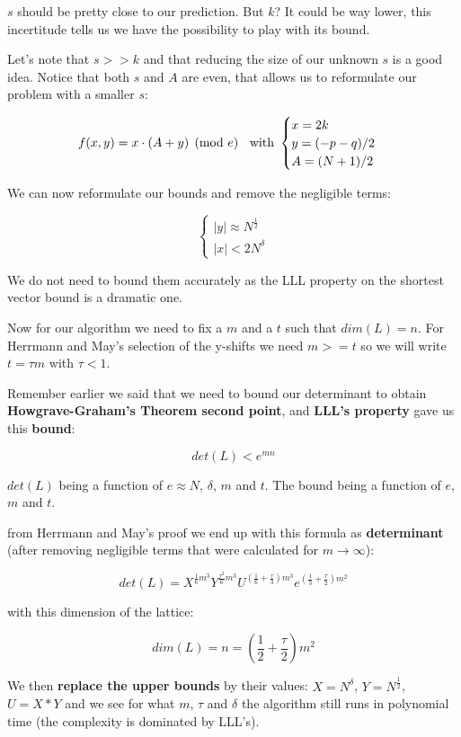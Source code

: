 \documentclass[a4paper,11pt]{article}
\begin{document}
$s$ should be pretty close to our prediction. But $k$? It could be way lower, this incertitude tells us we have the possibility to play with its bound.

Let's note that $s >> k$ and that reducing the size of our unknown $s$ is a good idea. Notice that both $s$ and $A$ are even, that allows us to reformulate our problem with a smaller $s$:

\[ f(x,y) = x \cdot ( A + y) \pmod{e}  \hspace{2mm} \mbox{ with } \begin{cases} x = 2k \\
 y = (-p-q)/2\\
 A = (N+1)/2
 \end{cases} \]
 
 We can now reformulate our bounds and remove the negligible terms:

\[ \begin{cases} |y| \approx N^{\frac{1}{2}}\\
|x| < 2N^\delta
\end{cases}\]

We do not need to bound them accurately as the LLL property on the shortest vector bound is a dramatic one.

Now for our algorithm we need to fix a $m$ and a $t$ such that $dim(L) = n$. For Herrmann and May's selection of the y-shifts we need $m >= t$ so we will write $t = \tau m$ with $\tau < 1$.

Remember earlier we said that we need to bound our determinant to obtain \textbf{Howgrave-Graham's Theorem second point}, and \textbf{LLL's property} gave us this \textbf{bound}:

\[ det(L) < e^{mn} \]

$det(L)$ being a function of $e \approx N$, $\delta$, $m$ and $t$. The bound being a function of $e$, $m$ and $t$.

from Herrmann and May's proof we end up with this formula as \textbf{determinant} (after removing negligible terms that were calculated for $m \rightarrow \infty$):

\[ det(L) = X^{\frac{1}{6}m^3} Y^{\frac{\tau^2}{6}m^3} U^{(\frac{1}{6} + \frac{\tau}{3})m^3} e^{(\frac{1}{3} + \frac{\tau}{2})m^2} \]

with this dimension of the lattice:

\[ dim(L) = n = \left(\frac{1}{2} + \frac{\tau}{2}\right)m^2 \]

We then \textbf{replace the upper bounds} by their values: $X = N^\delta$, $Y = N^{\frac{1}{2}}$, $U = X*Y$ and we see for what $m$, $\tau$ and $\delta$ the algorithm still runs in polynomial time (the complexity is dominated by LLL's).
\end{document}
